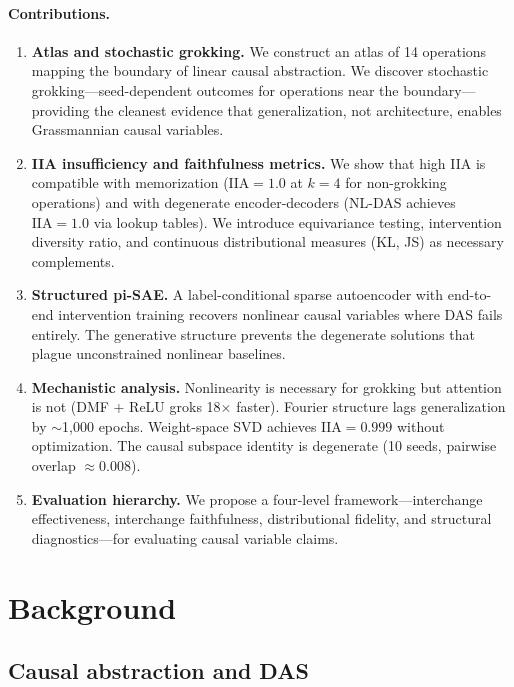 \documentclass{article}
\newcommand{\IIA}{\mathrm{IIA}}
\begin{document}
\paragraph{Contributions.}
\begin{enumerate}[leftmargin=*]
\item \textbf{Atlas and stochastic grokking.} We construct an atlas of 14
  operations mapping the boundary of linear causal abstraction. We discover
  stochastic grokking---seed-dependent outcomes for operations near the
  boundary---providing the cleanest evidence that generalization, not
  architecture, enables Grassmannian causal variables.
\item \textbf{IIA insufficiency and faithfulness metrics.} We show that
  high IIA is compatible with memorization ($\IIA = 1.0$ at $k{=}4$ for
  non-grokking operations) and with degenerate encoder-decoders (NL-DAS
  achieves $\IIA = 1.0$ via lookup tables). We introduce equivariance
  testing, intervention diversity ratio, and continuous distributional
  measures (KL, JS) as necessary complements.
\item \textbf{Structured pi-SAE.} A label-conditional sparse autoencoder
  with end-to-end intervention training recovers nonlinear causal
  variables where DAS fails entirely. The generative structure prevents
  the degenerate solutions that plague unconstrained nonlinear baselines.
\item \textbf{Mechanistic analysis.} Nonlinearity is necessary for grokking
  but attention is not (DMF + ReLU groks 18$\times$ faster). Fourier
  structure lags generalization by $\sim$1{,}000 epochs. Weight-space SVD
  achieves $\IIA = 0.999$ without optimization. The causal subspace identity
  is degenerate (10 seeds, pairwise overlap $\approx 0.008$).
\item \textbf{Evaluation hierarchy.} We propose a four-level framework---interchange effectiveness, interchange faithfulness, distributional
  fidelity, and structural diagnostics---for evaluating causal variable
  claims.
\end{enumerate}


\section{Background}
\label{sec:background}

\subsection{Causal abstraction and DAS}
\end{document}
